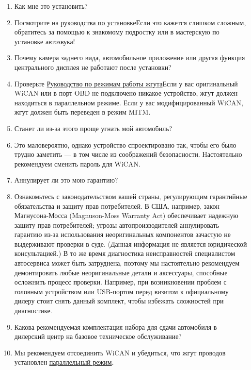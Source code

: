 \documentclass[superscriptaddress,onecolumn,floatfix]{revtex4-2}
\begin{document}
\begin{enumerate}
  \item[В:] Как мне это установить?
  \item[A:] Посмотрите на \href{https://github.com/tylerharvey/Ioniq5_CAN/blob/main/guides/}{руководства по установке}Если это кажется слишком сложным, обратитесь за помощью к знакомому подростку или в мастерскую по установке автозвука!
  \item[В:] Почему камера заднего вида, автомобильное приложение или другая функция центрального дисплея не работают после установки?
  \item[A:] Проверьте \href{https://github.com/tylerharvey/Ioniq5_CAN/blob/main/guides/harnesses/head_unit_MITM/MITM_harness_modes.pdf}{Руководство по режимам работы жгута}Если у вас оригинальный WiCAN или в порт OBD не подключено никакое устройство, жгут должен находиться в параллельном режиме. Если у вас модифицированный WiCAN, жгут должен быть переведен в режим MITM.
  \item[В:] Станет ли из-за этого проще угнать мой автомобиль?
  \item[A:] Это маловероятно, однако устройство спроектировано так, чтобы его было трудно заметить — в том числе из соображений безопасности. Настоятельно рекомендуем сменить пароль для WiCAN. 
  \item[В:] Аннулирует ли это мою гарантию?
  \item[A:] Ознакомьтесь с законодательством вашей страны, регулирующим гарантийные обязательства и защиту прав потребителей. В США, например, закон Магнусона-Мосса (Magnuson-Moss Warranty Act) обеспечивает надежную защиту прав потребителей; угрозы автопроизводителей аннулировать гарантию из-за использования неоригинальных компонентов зачастую не выдерживают проверки в суде. (Данная информация не является юридической консультацией.) В то же время диагностика неисправностей специалистом автосервиса может быть затруднена, поэтому мы настоятельно рекомендуем демонтировать любые неоригинальные детали и аксессуары, способные осложнить процесс проверки. Например, при возникновении проблем с головным устройством или USB-портом перед визитом к официальному дилеру стоит снять данный комплект, чтобы избежать сложностей при диагностике. 
  \item[В:] Какова рекомендуемая комплектация набора для сдачи автомобиля в дилерский центр на базовое техническое обслуживание?
  \item[A:] Мы рекомендуем отсоединить WiCAN и убедиться, что жгут проводов установлен \href{https://github.com/tylerharvey/Ioniq5_CAN/blob/main/guides/harnesses/head_unit_MITM/MITM_harness_modes.pdf}{параллельный режим}.

\end{enumerate}
\end{document}
